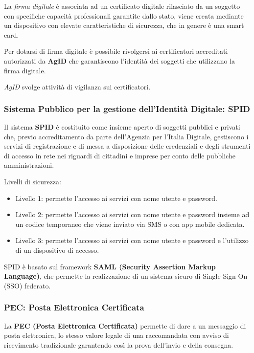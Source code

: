             La \textit{firma digitale} è associata ad un certificato digitale rilasciato da un soggetto con specifiche capacità professionali garantite dallo stato, viene creata mediante un dispositivo con elevate caratteristiche di sicurezza, che in genere è una smart card.
        
            Per dotarsi di firma digitale è possibile rivolgersi ai certificatori accreditati autorizzati da \textbf{AgID} che garantiscono l'identità dei soggetti che utilizzano la firma digitale.
        
            \textit{AgID} svolge attività di vigilanza sui certificatori.
        
        \subsubsection{Sistema Pubblico per la gestione dell'Identità Digitale: SPID}
            Il sistema \textbf{SPID} è costituito come insieme aperto di soggetti pubblici e privati che, previo accreditamento da parte dell'Agenzia per l'Italia Digitale, gestiscono i servizi di registrazione e di messa a disposizione delle credenziali e degli strumenti di accesso in rete nei riguardi di cittadini e imprese per conto delle pubbliche amministrazioni.
        
            Livelli di sicurezza:
            \begin{itemize}
                \item Livello 1: permette l'accesso ai servizi con nome utente e password.
                \item Livello 2: permette l'accesso ai servizi con nome utente e password insieme ad un codice temporaneo che viene inviato via SMS o con app mobile dedicata.
                \item Livello 3: permette l'accesso ai servizi con nome utente e password e l'utilizzo di un dispositivo di accesso.
            \end{itemize}

            SPID è basato sul framework \textbf{SAML (Security Assertion Markup Language)}, che permette la realizzazione di un sistema sicuro di Single Sign On (SSO) federato.

        \subsubsection{PEC: Posta Elettronica Certificata}
            La \textbf{PEC (Posta Elettronica Certificata)} permette di dare a un messaggio di posta elettronica, lo stesso valore legale di una raccomandata con avviso di ricevimento tradizionale garantendo così la prova dell'invio e della consegna.
        
